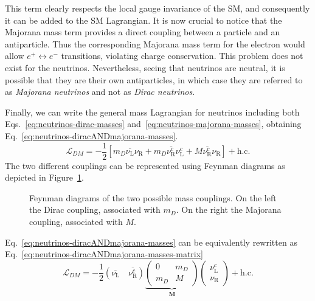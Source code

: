 This term clearly respects the local gauge invariance of the \ac{SM}, and consequently it can be added to the \ac{SM} Lagrangian. 
It is now crucial to notice that the Majorana mass term provides a direct coupling between a particle and an antiparticle. 
Thus the corresponding Majorana mass term for the electron would allow $e^+ \leftrightarrow e^-$ transitions, violating charge conservation. 
This problem does not exist for the neutrinos. Nevertheless, seeing that neutrinos are neutral, it is possible that they are their own 
antiparticles, in which case they are referred to as \textit{Majorana neutrinos} and not as \textit{Dirac neutrinos}.

Finally, we can write the general mass Lagrangian for neutrinos including both Eqs.~\ref{eq:neutrinos-dirac-masses} 
and~\ref{eq:neutrinos-majorana-masses}, obtaining Eq.~\ref{eq:neutrinos-diracANDmajorana-masses}.
\begin{equation}
    \label{eq:neutrinos-diracANDmajorana-masses}
    \mathcal{L}_{DM} = -\frac{1}{2} \left[ m_D \overline{\nu_\text{L}}\nu_\text{R} + m_D \overline{\nu_\text{R}^c}\nu_\text{L}^c + M \overline{\nu_\text{R}^c}\nu_\text{R} \right] + \text{h.c.}
\end{equation}
The two different couplings can be represented using Feynman diagrams as depicted in Figure~\ref{fig:feynman-massCouplings}.
\begin{figure}[H]
    \centering
    
    \caption{Feynman diagrams of the two possible mass couplings. On the left the Dirac coupling, associated with $m_D$. On the right the Majorana coupling, associated with $M$.}
    \label{fig:feynman-massCouplings}
\end{figure}

Eq.~\ref{eq:neutrinos-diracANDmajorana-masses} can be equivalently rewritten as Eq.~\ref{eq:neutrinos-diracANDmajorana-masses-matrix}
\begin{equation}
    \label{eq:neutrinos-diracANDmajorana-masses-matrix}
    \mathcal{L}_{DM} = -\frac{1}{2} \left( \overline{\nu_\text{L}} \quad \overline{\nu_\text{R}^c} \right) \underbrace{\begin{pmatrix} 0 & m_D \\ m_D & M \end{pmatrix}}_{\mathbf{M}} \begin{pmatrix} \nu_\text{L}^c \\ \nu_\text{R} \end{pmatrix} + \text{h.c.}
\end{equation}

